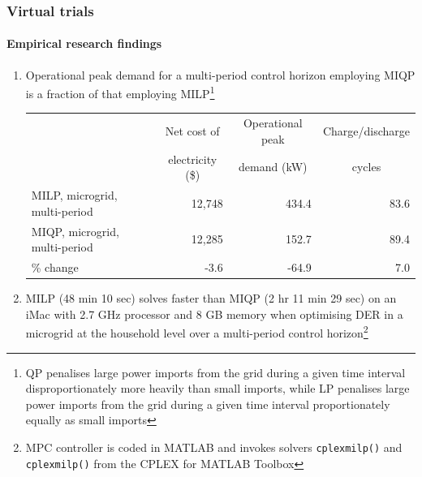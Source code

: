 \documentclass[presentation, smaller, xcolor=table]{beamer}
\newcounter{enumcount}
\begin{document}
\begin{frame}
	\frametitle{Virtual trials}
	\framesubtitle{Empirical research findings}

	\begin{enumerate}
		\setcounter{enumi}{\value{enumcount}}
		\item  Operational peak demand for a multi-period control horizon employing MIQP is a fraction of that employing MILP\footnote{\scriptsize QP penalises large power imports from the grid during a given time interval disproportionately more heavily than small imports, while LP penalises large power imports from the grid during a given time interval proportionately equally as small imports
		}
			\begin{table}
			\centering
			{\scriptsize
			\begin{tabular}{l r r r}
				\toprule
				& \multicolumn{1}{c}{Net cost of}	& \multicolumn{1}{c}{Operational peak}	& \multicolumn{1}{c}{Charge/discharge}	\\
				& \multicolumn{1}{c}{	electricity (\$)} 	& \multicolumn{1}{c}{demand (kW)}		&\multicolumn{1}{c}{cycles}	\\
				\midrule
				MILP, microgrid, multi-period		& 12,748	& 434.4	& 83.6	\\
				MIQP, microgrid, multi-period		& 12,285	& 152.7	& 89.4	\\
				\midrule
				\% change	& -3.6		& -64.9		& 7.0		\\
				\bottomrule
			\end{tabular}
			}
			\end{table}
		
		\item  MILP (48 min 10 sec) solves faster than MIQP (2 hr 11 min 29 sec) on an iMac with 2.7 GHz processor and 8 GB memory when optimising DER in a microgrid at the household level over a multi-period control horizon\footnote{\scriptsize MPC controller is coded in \textsc{MATLAB} and invokes solvers \texttt{cplexmilp()} and \texttt{cplexmilp()} from the CPLEX for \textsc{MATLAB} Toolbox
		}
	
	\end{enumerate}

\end{frame}
\end{document}
